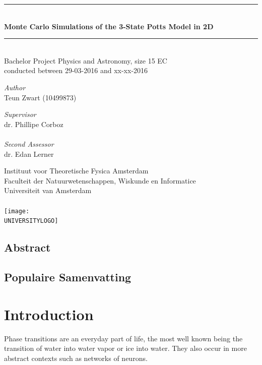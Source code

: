 \documentclass[11pt, a4paper]{report} %
\newcommand\TITLE{Monte Carlo Simulations of the 3-State Potts Model in 2D}
\newcommand\THESISFORM{Bachelor Project Physics and Astronomy, size 15 EC\\conducted between 29-03-2016 and xx-xx-2016}
\newcommand\INSTITUTE{Instituut voor Theoretische Fysica Amsterdam}
\newcommand\FACULTY{Faculteit der Natuurwetenschappen, Wiskunde en Informatice}
\newcommand\UNIVERSITY{Universiteit van Amsterdam}
\newcommand\AUTHOR{Teun Zwart (10499873)}
\newcommand\SUPERVISOR{dr. Phillipe Corboz}
\newcommand\SECONDASSESSOR{dr. Edan Lerner}
\newcommand\UNIVERSITYLOGO{UvA-logo.png} %
\begin{document}
\begin{titlepage}
	\begin{center}
		\rule{\textwidth}{0.4mm}\\[0.5cm]
		\huge{\textbf{\TITLE}}
		\rule{\textwidth}{0.4mm}\\[0.5cm]
		\large{\THESISFORM}\\[0.5cm]
		\begin{minipage}[t]{0.4\textwidth}
			\begin{flushleft}
				\large\emph{Author}\\{\AUTHOR}
			\end{flushleft}
		\end{minipage}
		\begin{minipage}[t]{0.4\textwidth}
			\begin{flushright}
				\large\emph{Supervisor}\\{\SUPERVISOR}\\~\\
				\large\emph{Second Assessor}\\{\SECONDASSESSOR}
			\end{flushright}
		\end{minipage}
		\vfill
		\large{\INSTITUTE}\\
		\large{\FACULTY}\\
		\large{\UNIVERSITY}\\~\\
		\texttt{[image: \\UNIVERSITYLOGO]}
	\end{center}
\end{titlepage}

\thispagestyle{plain}
\section*{Abstract}


\newpage
\thispagestyle{plain}
\section*{Populaire Samenvatting}


\tableofcontents

\chapter*{Introduction}
Phase transitions are an everyday part of life, the most well known being the transition of water into water vapor or ice into water.
They also occur in more abstract contexts such as networks of neurons.\cite{tkacik:2015}
\end{document}
